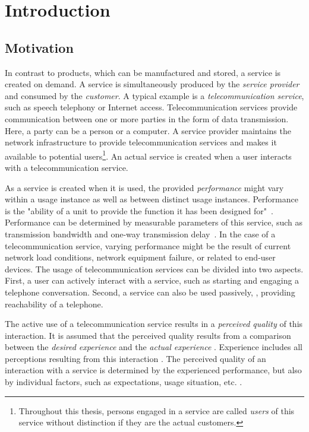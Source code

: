 \chapter{Introduction}\label{chap:01}

\section{Motivation}
In contrast to products, which can be manufactured and stored, a service is created on demand.
A service is simultaneously produced by the \emph{service provider} and consumed by the \emph{customer}.
A typical example is a \emph{telecommunication service}, such as speech telephony or Internet access.
Telecommunication services provide communication between one or more parties in the form of data transmission.
Here, a party can be a person or a computer.
A service provider maintains the network infrastructure to provide telecommunication services and makes it available to potential users\footnote{Throughout this thesis, persons engaged in a service are called \emph{users} of this service without distinction if they are the actual customers.}.
An actual service is created when a user interacts with a telecommunication service.

As a service is created when it is used, the provided \emph{performance} might vary within a usage instance as well as between distinct usage instances.
Performance is the "ability of a unit to provide the function it has been designed for"~\citep[][p.\,360]{moller_quality_2005}.
Performance can be determined by measurable parameters of this service, such as transmission bandwidth and one-way transmission delay~\citep[][p.\,12]{moller_assessment_2000}.
In the case of a telecommunication service, varying performance might be the result of current network load conditions, network equipment failure, or related to end-user devices.
The usage of telecommunication services can be divided into two aspects.
First, a user can actively interact with a service, such as starting and engaging a telephone conversation.
Second, a service can also be used passively, \eg, providing reachability of a telephone.

The active use of a telecommunication service results in a \emph{perceived quality} of this interaction.
It is assumed that the perceived quality results from a comparison between the \emph{desired experience} and the \emph{actual experience} \citep[][p.\,13]{raake_quality_2014}. %
Experience includes all perceptions resulting from this interaction \citep[][p.\,13]{raake_quality_2014}.
The perceived quality of an interaction with a service is determined by the experienced performance, but also by individual factors, such as expectations, usage situation, etc. \citep[\eg,][p.\,55ff.]{reiter_factors_2014}.

